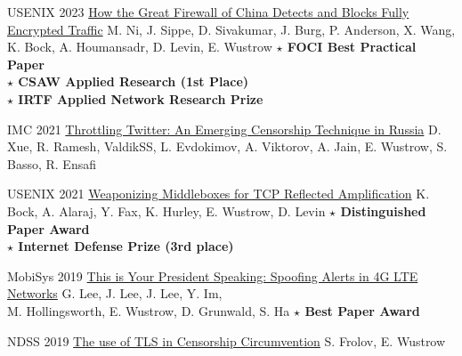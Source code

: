 \documentclass{tccv}
\begin{document}
\begin{publist}

\item{USENIX 2023}
     {\href{https://gfw.report/publications/usenixsecurity23/en/}{How the Great Firewall of China Detects and Blocks Fully Encrypted Traffic}}
     {M. Ni, J. Sippe, D. Sivakumar, J. Burg, P. Anderson, X. Wang, K. Bock,  A. Houmansadr, D. Levin, E. Wustrow}
    {\textbf{$\star$ FOCI Best Practical Paper}\\
     \textbf{$\star$ CSAW Applied Research (1st Place)}\\
     \textbf{$\star$ IRTF Applied Network Research Prize}}

\item{IMC 2021}
     {\href{https://throttletwitter.com/}{Throttling Twitter: An Emerging Censorship Technique in Russia}}
     {D. Xue, R. Ramesh, ValdikSS, L. Evdokimov, A. Viktorov, A. Jain, E. Wustrow, S. Basso, R. Ensafi}

\item{USENIX 2021}
     {\href{https://geneva.cs.umd.edu/posts/usenix21-weaponizing-censors/}{Weaponizing Middleboxes for TCP Reflected Amplification}}
     {K. Bock, A. Alaraj, Y. Fax, K. Hurley, E. Wustrow, D. Levin}
    {\textbf{$\star$ Distinguished Paper Award}\\
     \textbf{$\star$ Internet Defense Prize (3rd place)}}


\item{MobiSys 2019}
     {\href{https://ericw.us/trow/lte-alerts.pdf}{This is Your President Speaking: Spoofing Alerts in 4G LTE Networks}}
    {G. Lee, J. Lee, J. Lee, Y. Im, \\
     M. Hollingsworth, E. Wustrow, D. Grunwald, S. Ha}
    {\textbf{$\star$ Best Paper Award}}

\item{NDSS 2019}
     {\href{https://tlsfingerprint.io}{The use of TLS in Censorship Circumvention}}
     {S. Frolov, E. Wustrow}


\end{publist}

\end{document}
